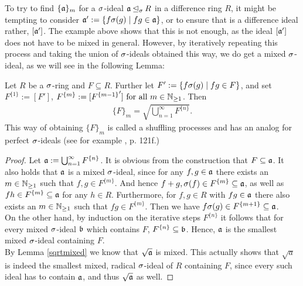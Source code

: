 To try to find $\{\mathfrak{a}\}_m$ for a $\sigma$-ideal $\mathfrak{a} \unlhd_{\sigma} R$ in a difference ring $R$, it might be tempting to consider $\mathfrak{a}':= \{ f\sigma(g) \mid fg \in \mathfrak{a} \}$, or to ensure that is a difference ideal rather, $[\mathfrak{a}']$. The example above shows that this is not enough,
as the ideal $[\mathfrak{a}']$ does not have to be mixed in general. However, by iteratively repeating this process and taking the union of $\sigma$-ideals obtained this way, we do get a mixed $\sigma$-ideal, as we will see in the following Lemma:
\begin{lem}\label{lemshuffling}
Let $R$ be a $\sigma$-ring and $F \subseteq R$. Further let $F' := \{f\sigma(g) \mid fg \in F \}$, and set $F^{\{1\}}:= [F']$, $F^{\{m\}}:= [{F^{\{m-1\}}}'] \text{ for all } m \in \mathbb{N}_{\geq1}$. Then
\begin{align} \{F\}_m = \sqrt{\bigcup_{n=1}^{\infty} F^{\{n\}}}. \end{align}
This way of obtaining $\{F\}_m$ is called a shuffling processes and has an analog for perfect $\sigma$-ideals (see for example \cite{levin}, p. 121f.) 
\begin{proof}
Let $\mathfrak{a}:= \bigcup_{n=1}^{\infty} F^{\{n\}}$. It is obvious from the construction that $F \subseteq \mathfrak{a}$. It also holds that $\mathfrak{a}$ is a mixed $\sigma$-ideal, since for any $f,g \in \mathfrak{a}$ there exists an $m \in \mathbb{N}_{\geq1}$ such that $f,g \in F^{\{m\}}$.
And hence $f + g, \sigma(f) \in F^{\{m\}} \subseteq \mathfrak{a}$, as well as $fh \in F^{\{m\}} \subseteq \mathfrak{a}$ for any $h \in R$. Furthermore, for $f, g \in R$ with $fg \in \mathfrak{a}$ there also exists an $m \in \mathbb{N}_{\geq1}$ such that $fg \in F^{\{m\}}$. 
Then we have $f\sigma(g) \in F^{\{m+1\}} \subseteq \mathfrak{a}$. \\
\indent On the other hand, by induction on the iterative steps $F^{\{n\}}$ it follows that for every mixed $\sigma$-ideal $\mathfrak{b}$ which contains $F$, $F^{\{n\}} \subseteq \mathfrak{b}$. Hence, $\mathfrak{a}$ is the smallest mixed $\sigma$-ideal containing $F$. \\
\indent By Lemma \ref{sqrtmixed} we know that $\sqrt{\mathfrak{a}}$ is mixed. This actually shows that $\sqrt a$ is indeed the smallest mixed, radical $\sigma$-ideal of $R$ containing $F$, since every such ideal has to contain $\mathfrak{a}$, and thus $\sqrt{\mathfrak{a}}$ as well.

\end{proof}
\end{lem}


